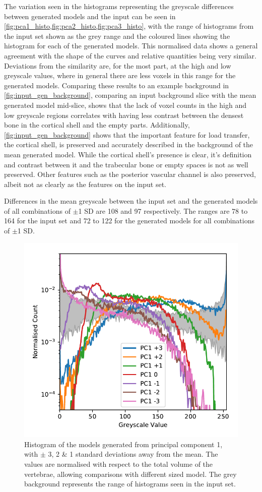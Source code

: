 The variation seen in the histograms representing the greyscale differences
between generated models and the input can be seen in
\cref{fig:pca1_histo,fig:pca2_histo,fig:pca3_histo}, with the range of
histograms from the input set shown as the grey range and the coloured lines
showing the histogram for each of the generated models.  This normalised data
shows a general agreement with the shape of the curves and relative quantities
being very similar.  Deviations from the similarity are, for the most part, at
the high and low greyscale values, where in general there are less voxels in
this range for the generated models.  Comparing these results to an example
background in \cref{fig:input_gen_background}, comparing an input background
slice with the mean generated model mid-slice, shows that the lack of voxel
counts in the high and low greyscale regions correlates with having less
contrast between the densest bone in the cortical shell and the empty parts.
Additionally, \cref{fig:input_gen_background} shows that the important feature
for load transfer, the cortical shell, is preserved and accurately described in
the background of the mean generated model.  While the cortical shell's
presence is clear, it's definition and contrast between it and the trabecular
bone or empty spaces is not as well preserved.  Other features such as the
posterior vascular channel is also preserved, albeit not as clearly as the
features on the input set.

Differences in the mean greyscale between the input set and the generated
models of all combinations of $\pm$1 SD are 108 and 97 respectively.  The
ranges are 78 to 164 for the input set and 72 to 122 for the generated models
for all combinations of $\pm$1 SD.
\begin{figure}[h!]
  \centering
  \includegraphics[width=.65\textwidth]{Chapters/Chapter_PCA_images/pca1_histo.pdf}
  \caption{Histogram of the models generated from principal component 1, with $\pm$ 3, 2 \& 1 standard deviations away from the mean. The values are normalised with respect to the total volume of the vertebrae, allowing comparisons with different sized model. The grey background represents the range of histograms seen in the input set.}
  \label{fig:pca1_histo}
\end{figure}


